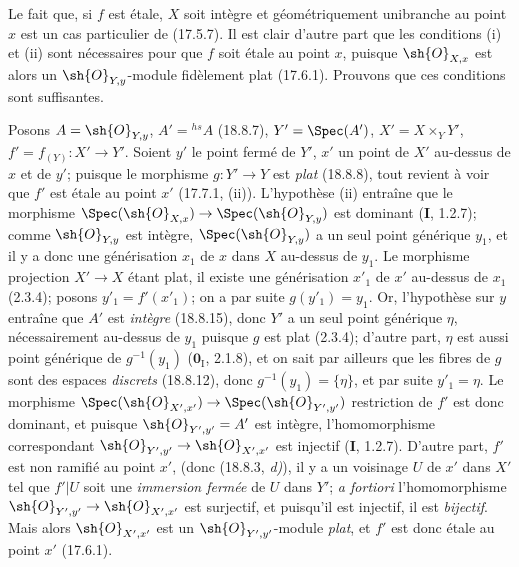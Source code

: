 Le fait que, si $f$ est étale, $X$ soit intègre et géométriquement unibranche au point $x$ est un cas particulier de (17.5.7). Il est clair d'autre part que les conditions (i) et (ii) sont nécessaires pour que $f$ soit étale au point $x$, puisque $\sh{O}_{X,x}$ est alors un $\sh{O}_{Y,y}$-module fidèlement plat (17.6.1). Prouvons que ces conditions sont suffisantes.

Posons $A=\sh{O}_{Y,y}$, $A'={}^{hs}\!A$ (18.8.7), $Y'=\Spec(A')$, $X'=X\times_Y Y'$, $f'=f_{(Y)}:X'\to Y'$. Soient $y'$ le point fermé de $Y'$, $x'$ un point de $X'$ au-dessus de $x$ et de $y'$; puisque le morphisme $g:Y'\to Y$ est \emph{plat} (18.8.8), tout revient à voir que $f'$ est étale au point $x'$ (17.7.1, (ii)). L'hypothèse (ii) entraîne que le morphisme $\Spec(\sh{O}_{X,x})\to\Spec(\sh{O}_{Y,y})$ est dominant (\textbf{I}, 1.2.7); comme $\sh{O}_{Y,y}$ est intègre, $\Spec(\sh{O}_{Y,y})$ a un seul point générique $y_1$, et il y a donc une générisation $x_1$ de $x$ dans $X$ au-dessus de $y_1$. Le morphisme projection $X'\to X$ étant plat, il existe une générisation $x'_1$ de $x'$ au-dessus de $x_1$ (2.3.4); posons $y'_1=f'(x'_1)$; on a par suite $g(y'_1)=y_1$. Or, l'hypothèse sur $y$ entraîne que $A'$ est \emph{intègre} (18.8.15), donc $Y'$ a un seul point générique $\eta$, nécessairement au-dessus de $y_1$ puisque $g$
est plat (2.3.4); d'autre part, $\eta$ est aussi point générique de $g^{-1}(y_1)$ ($\mathbf{0}_{\mathrm I}$, 2.1.8), et on sait par ailleurs que les fibres de $g$ sont des espaces \emph{discrets} (18.8.12), donc $g^{-1}(y_1)=\{\eta\}$, et par suite $y'_1=\eta$. Le morphisme $\Spec(\sh{O}_{X',x'})\to\Spec(\sh{O}_{Y',y'})$ restriction de $f'$ est donc dominant, et puisque $\sh{O}_{Y',y'}=A'$ est intègre, l'homomorphisme correspondant $\sh{O}_{Y',y'}\to\sh{O}_{X',x'}$ est injectif (\textbf{I}, 1.2.7). D'autre part, $f'$ est non ramifié au point $x'$, (donc (18.8.3, \emph{d)}), il y a un voisinage $U$ de $x'$ dans $X'$ tel que $f'|U$ soit une \emph{immersion fermée} de $U$ dans $Y'$; \emph{a fortiori} l'homomorphisme $\sh{O}_{Y',y'}\to\sh{O}_{X',x'}$ est surjectif, et puisqu'il est injectif, il est \emph{bijectif}. Mais alors $\sh{O}_{X',x'}$ est un $\sh{O}_{Y',y'}$-module \emph{plat}, et $f'$ est donc étale au point $x'$ (17.6.1).

